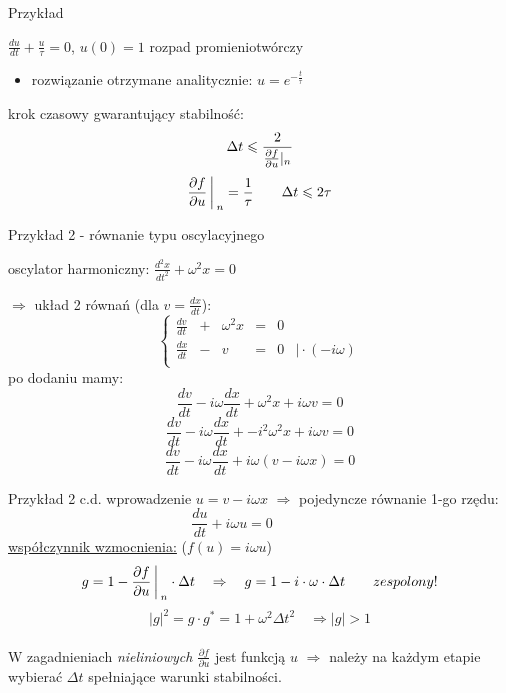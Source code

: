 \begin{frame}{Przykład}
	\begin{center}
	$\frac{du}{dt}+\frac{u}{\tau} = 0$, \quad $u(0) = 1$
	\newline 
	rozpad promieniotwórczy\par
      \begin{itemize}
    \item rozwiązanie otrzymane analitycznie: $u = e^{-\frac{t}{\tau}}$
    \end{itemize}
	\end{center}
  
  krok czasowy gwarantujący stabilność:
  $$
  \Delta t \leqslant \frac{2}{\frac{\partial f}{\partial u}\arrowvert_n}$$
  $$\frac{\partial f}{\partial u}\bigg\arrowvert_n = \frac{1}{\tau}\qquad \Delta t \leqslant 2\tau$$
 
\end{frame}

\begin{frame}{Przykład 2 - równanie typu oscylacyjnego}
	\begin{center}
		oscylator harmoniczny: \qquad $\frac{d^2x}{dt^2}+ \omega^2x=0$
	\end{center}
    $\Rightarrow$ układ 2 równań (dla $v=\frac{dx}{dt}$):
    $$\left\{\begin{array}{lcclll}
	\frac{dv}{dt}&+&\omega^2x&=&0 &\\
	\frac{dx}{dt}&-&v&=&0 & \mid \cdot (-i \omega )\\
	\end{array} \right.$$
	po dodaniu mamy:
	$$ 	\frac{dv}{dt}-i \omega \frac{dx}{dt}+
	\omega^2 x+i \omega v  = 0$$
	$$ 	\frac{dv}{dt}-i \omega \frac{dx}{dt}+
	-i^2 \omega^2 x+i \omega v  = 0$$
	$$ 	\frac{dv}{dt}-i \omega \frac{dx}{dt}+
	i\omega( v-i\omega x ) = 0$$
	 \end{frame}
    \begin{frame}{Przykład 2 c.d.}
    wprowadzenie \underline{$u = v-i\omega x$} $\Rightarrow$ pojedyncze równanie 1-go rzędu:
    $$ \frac{du}{dt} + i\omega u= 0 \qquad  \qquad $$
\underline{współczynnik wzmocnienia:} ($f(u)=i\omega u$)
    $$g = 1-{\frac{\partial f}{\partial u}}\bigg\arrowvert _n \cdot \Delta t \quad \Rightarrow \quad g=1-i\cdot \omega \cdot \Delta t \qquad zespolony!$$
	$$|g|^2 = g \cdot g^* = 1+\omega^2 {\Delta t}^2 \quad 
 \Rightarrow |g| > 1 $$
  \\
    W zagadnieniach \textit{nieliniowych $\frac{\partial f}{\partial u}$} jest funkcją $u$ \quad $\Rightarrow$ \quad należy na każdym etapie wybierać $\Delta t$ spełniające warunki stabilności. 
\end{frame}
